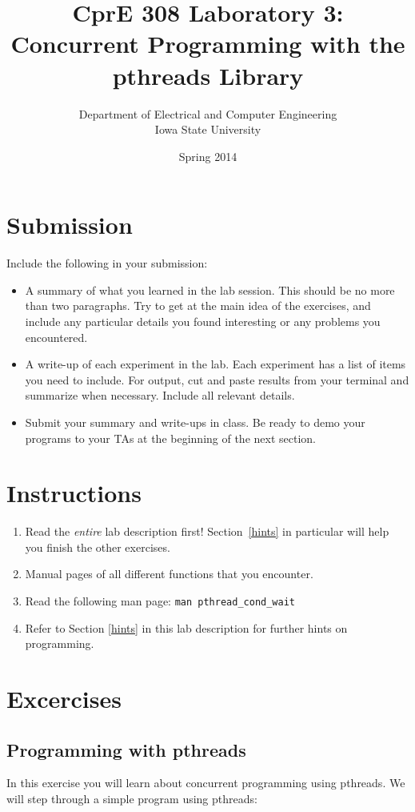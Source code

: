 \documentclass[letterpaper,10pt]{article}
\title{CprE 308 Laboratory 3: Concurrent Programming with the pthreads Library}
\author{Department of Electrical and Computer Engineering \\ Iowa State University}
\date{Spring 2014}
\begin{document}
\maketitle

\section{Submission}

Include the following in your submission:

\begin{itemize}
 \item A summary of what you learned in the lab session. This should be no more than two
 paragraphs. Try to get at the main idea of the exercises, and include any particular
 details you found interesting or any problems you encountered.

 \item A write-up of each experiment in the lab. Each experiment has a list of items
 you need to include. For output, cut and paste results from your terminal and
 summarize when necessary. Include all relevant details.

 \item Submit your summary and write-ups in class.  Be ready to demo your programs to your TAs at the beginning of the next section.

\end{itemize}

\section{Instructions}
\begin{enumerate}
 \item Read the \emph{entire} lab description first! Section~\ref{hints} in particular will help you finish the other exercises.
 \item Manual pages of all different functions that you encounter.
 \item Read the following man page: \verb!man pthread_cond_wait!
 \item Refer to Section \ref{hints} in this lab description for further hints on programming.
\end{enumerate}

\section{Excercises}
\subsection{Programming with pthreads}
In this exercise you will learn about concurrent programming using
pthreads. We will step through a simple program using pthreads:
\end{document}
